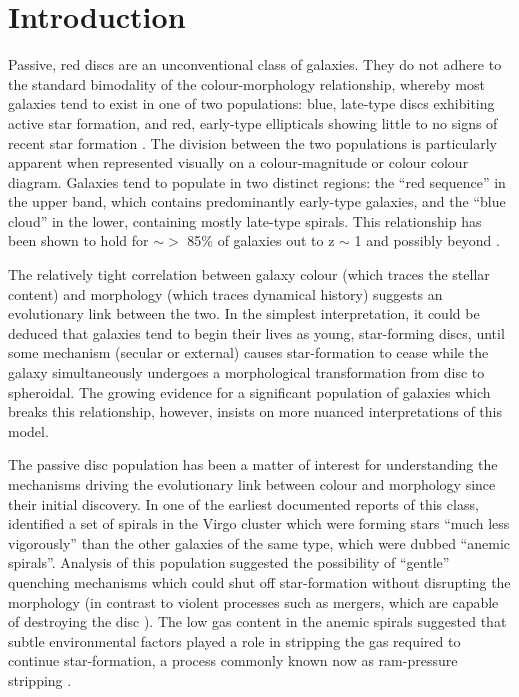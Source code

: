 \documentclass[useAMS,usenatbib]{mn2e}
\begin{document}
\section{Introduction}
\label{sec:Intro}

Passive, red discs are an unconventional class of galaxies. They do not adhere to the standard bimodality of the colour-morphology relationship, whereby most galaxies tend to exist in one of two populations: blue, late-type discs exhibiting active star formation, and red, early-type ellipticals showing little to no signs of recent star formation \citep{Strateva2001, Baldry2004, Correa2017}. The division between the two populations is particularly apparent when represented visually on a colour-magnitude or colour colour diagram. Galaxies tend to populate in two distinct regions: the ``red sequence'' in the upper band, which contains predominantly early-type galaxies, and the ``blue cloud'' in the lower, containing mostly late-type spirals. This relationship has been shown to hold for $\sim >$ 85\% of galaxies out to z $\sim$ 1 \citep{Bell2004,Cirasuolo2007,Mignoli2009} and possibly beyond \citep{Giallongo2005, vanDokkum2006, Franzetti2007, Cassata2008}. 

The relatively tight correlation between galaxy colour (which traces the stellar content) and morphology (which traces dynamical history) suggests an evolutionary link between the two. In the simplest interpretation, it could be deduced that galaxies tend to begin their lives as young, star-forming discs, until some mechanism (secular or external) causes star-formation to cease while the galaxy simultaneously undergoes a morphological transformation from disc to spheroidal. The growing evidence for a significant population of galaxies which breaks this relationship, however, insists on more nuanced interpretations of this model. 

The passive disc population has been a matter of interest for understanding the mechanisms driving the evolutionary link between colour and morphology since their initial discovery.  In one of the earliest documented reports of this class, \citet{VandenBergh1976} identified a set of spirals in the Virgo cluster which were forming stars ``much less vigorously'' than the other galaxies of the same type, which were dubbed ``anemic spirals''. Analysis of this population suggested the possibility of ``gentle'' quenching mechanisms which could shut off star-formation without disrupting the morphology (in contrast to violent processes such as mergers, which are capable of destroying the disc \citep{Bell2004,Negroponte1983,DeLucia2006,Springel2005}). The low gas content in the anemic spirals suggested that subtle environmental factors played a role in stripping the gas required to continue star-formation, a process commonly known now as ram-pressure stripping \citep{Gunn1972,Steinhauser2016}. 
\end{document}

